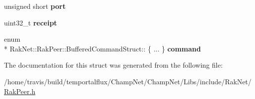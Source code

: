 \begin{DoxyCompactItemize}
\item 
\hypertarget{struct_rak_net_1_1_rak_peer_1_1_buffered_command_struct_a1082d205461e46670ccc092d27c81722}{unsigned short {\bfseries port}}\label{struct_rak_net_1_1_rak_peer_1_1_buffered_command_struct_a1082d205461e46670ccc092d27c81722}

\item 
\hypertarget{struct_rak_net_1_1_rak_peer_1_1_buffered_command_struct_ad87beaf4bd96dfd867a2e08eab16253a}{uint32\-\_\-t {\bfseries receipt}}\label{struct_rak_net_1_1_rak_peer_1_1_buffered_command_struct_ad87beaf4bd96dfd867a2e08eab16253a}

\item 
\hypertarget{struct_rak_net_1_1_rak_peer_1_1_buffered_command_struct_a25b1fc5a41162a44393d953bf3f1eb0f}{enum \\*
Rak\-Net\-::\-Rak\-Peer\-::\-Buffered\-Command\-Struct\-:: \{ ... \}  {\bfseries command}}\label{struct_rak_net_1_1_rak_peer_1_1_buffered_command_struct_a25b1fc5a41162a44393d953bf3f1eb0f}

\end{DoxyCompactItemize}


The documentation for this struct was generated from the following file\-:\begin{DoxyCompactItemize}
\item 
/home/travis/build/temportalflux/\-Champ\-Net/\-Champ\-Net/\-Libs/include/\-Rak\-Net/\hyperlink{_rak_peer_8h}{Rak\-Peer.\-h}\end{DoxyCompactItemize}
